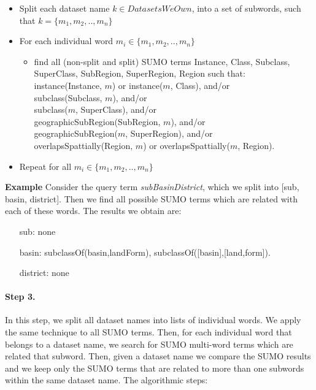 \documentclass[a4paper,10pt]{article}
\begin{document}
\begin{itemize}
 \item Split each dataset name $k \in DatasetsWeOwn$, into a set of subwords, such that $k=\{m_1,m_2,..,m_n\}$

\item For each individual word $m_i \in \{m_1,m_2,..,m_n\}$ 
				\begin{itemize}
				\item find all (non-split and split) SUMO  terms  Instance, Class, Subclass, SuperClass, SubRegion, SuperRegion, Region  such that: \\
		\indent instance(Instance, $m$) or instance($m$, Class), and/or 
	\\ \indent subclass(Subclass, $m$), and/or 
		\\  \indent subclass($m$, SuperClass), and/or
			\\	\indent  geographicSubRegion(SubRegion, $m$), and/or  
			\\ \indent geographicSubRegion($m$, SuperRegion), and/or  
			\\ \indent  overlapsSpattially(Region, $m$) or 	 overlapsSpattially($m$, Region).
	
	\end{itemize}	
\item Repeat for all $m_i \in \{m_1,m_2,..,m_n\} $
\end{itemize} 


\textbf{Example} Consider the query term \textit{subBasinDistrict}, which we split into [sub, basin, district]. Then we find all possible SUMO terms which are related with each of these words. The results we obtain are:\\
\begin{itemize}
\item[sub:] none
\item[basin:] subclassOf(basin,landForm), subclassOf([basin],[land,form]).
\item[district:] none 
\end{itemize}


\paragraph{Step 3.} In this step, we split all dataset names into lists of individual words. We apply the same technique to all SUMO terms. 
Then, for each individual word that belongs to a dataset name, we search for SUMO multi-word terms which are related  that subword. 
Then, given a dataset name we compare the SUMO results and we keep only the SUMO terms that are related to more than one subwords within the same 
dataset name.
The algorithmic steps:
\end{document}
